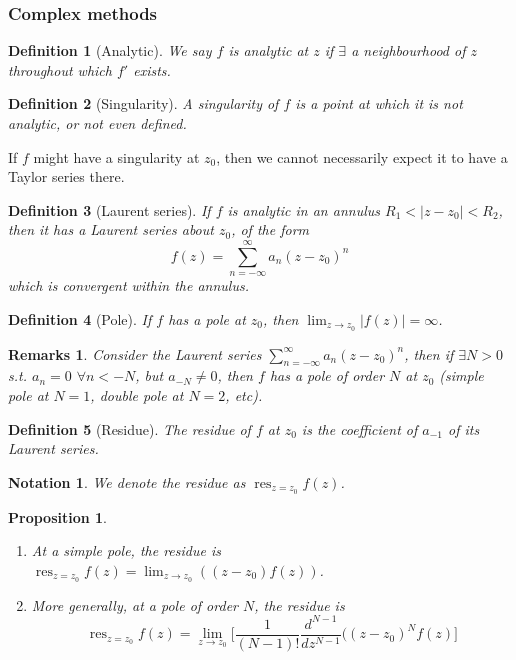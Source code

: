 \documentclass[a4paper]{article}
\DeclareMathOperator{\res}{res}
\newtheorem{remarks}{Remarks}[section]
\newtheorem{notation}{Notation}[section]
\theoremstyle{new}
\newtheorem{defi}{Definition}[section]
\newtheorem{prop}{Proposition}[section]
\begin{document}
\subsubsection{Complex methods}
\begin{defi}[Analytic]
We say $f$ is analytic at $z$ if $\exists$ a neighbourhood of $z$ throughout which $f'$ exists.
\end{defi}
\begin{defi}[Singularity]
A singularity of $f$ is a point at which it is not analytic, or not even defined.
\end{defi}
If $f$ might have a singularity at $z_0$, then we cannot necessarily expect it to have a Taylor series there.
\begin{defi}[Laurent series]
If $f$ is analytic in an annulus $R_1<|z-z_0|<R_2$, then it has a Laurent series about $z_0$, of the form
$$f(z)=\sum_{n=-\infty}^\infty a_n(z-z_0)^n$$
which is convergent within the annulus.
\end{defi}
\begin{defi}[Pole]
If $f$ has a pole at $z_0$, then $\lim_{z\rightarrow z_0}|f(z)|=\infty$.
\end{defi}
\begin{remarks}
Consider the Laurent series $\sum_{n=-\infty}^\infty a_n(z-z_0)^n$, then if $\exists N>0$ s.t. $a_n=0$ $\forall n<-N$, but $a_{-N}\neq 0$, then $f$ has a pole of order $N$ at $z_0$ (simple pole at $N=1$, double pole at $N=2$, etc).
\end{remarks}
\begin{defi}[Residue]
The residue of $f$ at $z_0$ is the coefficient of $a_{-1}$ of its Laurent series.
\end{defi}
\begin{notation}
We denote the residue as $\res_{z=z_0}f(z)$.
\end{notation}
\begin{prop}\leavevmode
\begin{enumerate}
    \item At a simple pole, the residue is $\res_{z=z_0}f(z)=\lim_{z\rightarrow z_0}((z-z_0)f(z))$.
    \item More generally, at a pole of order $N$, the residue is $$\res_{z=z_0}f(z)=\lim_{z\rightarrow z_0}\bigg[\frac{1}{(N-1)!}\frac{d^{N-1}}{dz^{N-1}}((z-z_0)^Nf(z)\bigg]$$
\end{enumerate}
\end{prop}
\end{document}
